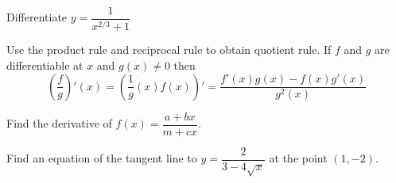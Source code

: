 \documentclass[../main.tex]{subfiles}
\begin{document}
\begin{example}
    Differentiate $y = \dfrac{1}{x^{2/3} + 1}$
\end{example}

Use the product rule and reciprocal rule to obtain quotient rule. If $f$ and $g$ are differentiable at $x$ and $g(x) \neq 0$ then
\[
    \left( \dfrac{f}{g} \right)'(x) = \left( \dfrac{1}{g}(x) f(x) \right)' = \dfrac{f'(x) g(x) - f(x) g'(x)}{g^2(x)}
\]

\begin{example}
    Find the derivative of $f(x) = \dfrac{a + b x}{m + c x}$.
\end{example}

\begin{example}
    Find an equation of the tangent line to $y = \dfrac{2}{3-4 \sqrt{x}}$ at the point $(1, -2)$.
\end{example}
\end{document}

